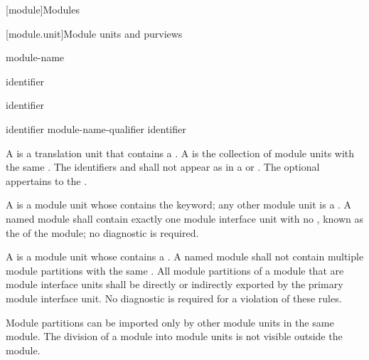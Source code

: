 [module]{Modules}%


[module.unit]{Module units and purviews}

\begin{bnf}
\br
      module-name   \terminal{;}
\end{bnf}

\begin{bnf}
\br
     identifier
\end{bnf}

\begin{bnf}
\br
    \terminal{:}  identifier
\end{bnf}

\begin{bnf}
\br
    identifier \br
    module-name-qualifier identifier 
\end{bnf}
  
\pnum
A  is a translation unit that contains
a .
A  is the
collection of module units with the same .
The identifiers  and 
shall not appear as 
in a  or .
The optional 
appertains to the .

\pnum
A  is a module unit whose
 contains the  keyword;
any other module unit is a .
A named module shall contain exactly one module interface unit
with no , known as the
 of the module;
no diagnostic is required.

\pnum
A  is
a module unit whose  contains
a .
A named module shall not contain multiple module partitions with
the same .
All module partitions of a module
that are module interface units
shall be directly or indirectly exported
by the primary module interface unit.
No diagnostic is required for a violation of these rules.
\begin{note}
Module partitions can be imported only by
other module units in the same module.
The division of a module into module units
is not visible outside the module.
\end{note}

